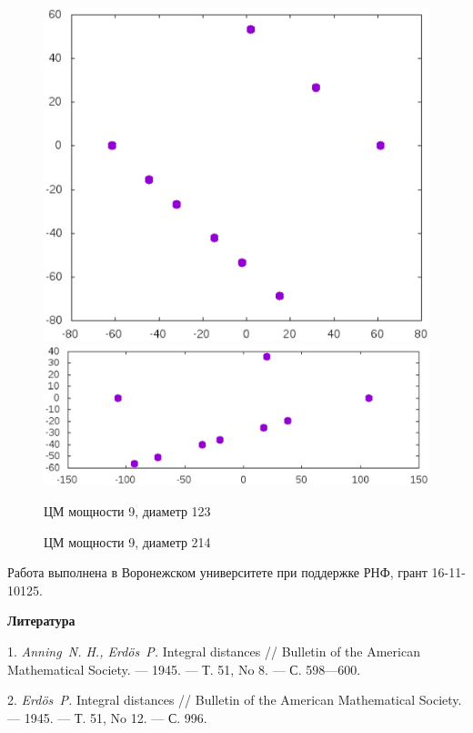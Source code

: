 \documentclass[12pt]{article}
\begin{document}
\begin{itemize}
\begin{figure}[htbp]
	\includegraphics[width=.48\linewidth]{Avdeev_9_123_1538485102263.eps}
	\hfill
	\includegraphics[width=.48\linewidth]{Avdeev_9_214_1538495187150.eps}
	\\
	\parbox{.48\linewidth}{\caption{ЦМ мощности 9, диаметр 123}\label{Avdeev_9_123_1538485102263.eps}}
	\hfill
	\parbox{.48\linewidth}{\caption{ЦМ мощности 9, диаметр 214}\label{Avdeev_9_214_1538495187150.eps}}
\end{figure}






\end{itemize}

{\small Работа выполнена в Воронежском университете при поддержке РНФ, грант 16-11-10125.}


\bigskip\centerline{\bf Литература}



1.	\emph{Anning~N. H., Erd\"{o}s~P.}
	Integral distances // Bulletin of the American Mathematical
	Society. --- 1945. --- Т. 51, No 8. --- С. 598---600.

2.	\emph{Erd\"{o}s~P.} Integral distances // Bulletin of the
	American Mathematical Society. --- 1945. --- Т. 51, No 12. --- С. 996.
\end{document}
